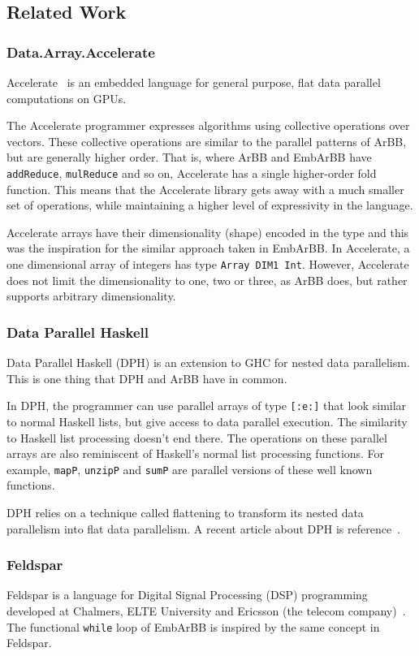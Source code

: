 
\subsection{Related Work} 
\subsubsection{Data.Array.Accelerate} 
Accelerate~ is an embedded language for general purpose, 
flat data parallel computations on GPUs. 

The Accelerate programmer expresses algorithms using collective operations 
over vectors. These collective operations are similar to the 
parallel patterns of ArBB, but are generally higher order. That is, where 
ArBB and EmbArBB have {\tt addReduce}, {\tt mulReduce} and so on, Accelerate
has a single higher-order fold function. This means that the Accelerate library
gets away with a much smaller set of operations, while maintaining a higher 
level of expressivity in the language. 

Accelerate arrays have their dimensionality (shape) encoded in the type 
and this was the inspiration for the similar approach taken in EmbArBB. In 
Accelerate, a one dimensional array of integers has type {\tt Array DIM1 Int}.
However, Accelerate does not limit the dimensionality to one, two or three,
as ArBB does, but rather supports arbitrary dimensionality.

\subsubsection{Data Parallel Haskell} 
Data Parallel Haskell (DPH) is an extension to GHC for nested data parallelism. 
This is one thing that DPH and ArBB have in common. 
 
In DPH, the programmer can use parallel arrays of type {\tt [:e:]} that look
similar to normal Haskell lists, but give access to data parallel execution.
The similarity to Haskell list processing doesn't end there. The operations 
on these parallel arrays are also reminiscent of Haskell's normal list processing functions.
For example, {\tt mapP}, {\tt unzipP} and {\tt sumP} are parallel versions of 
these well known functions. 

DPH relies on a technique called flattening to transform its nested data parallelism 
into flat data parallelism. 
A recent article about DPH is reference~. 
  
 

\subsubsection{Feldspar} 
Feldspar is a language for Digital Signal Processing (DSP) programming
developed at Chalmers, ELTE University and Ericsson 
(the telecom company)~. The functional {\tt while} loop 
of EmbArBB is inspired by the same concept in Feldspar. 

